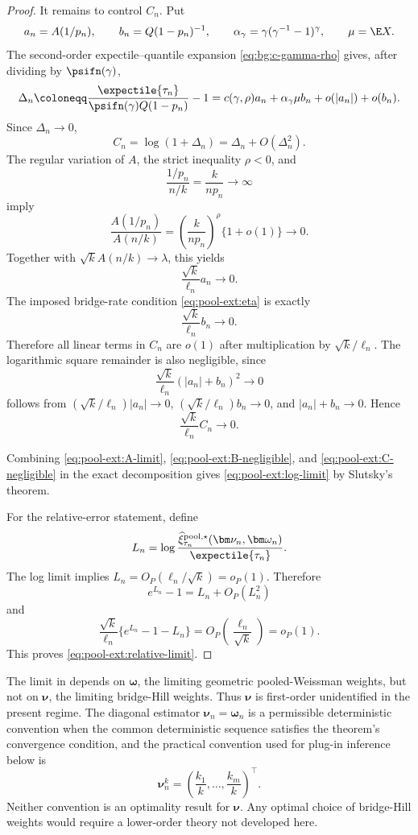 \begin{proof}
It remains to control \(C_n\). Put
\[
  a_n=A(1/p_n),
  \qquad
  b_n=Q(1-p_n)^{-1},
  \qquad
  \alpha_\gamma=\gamma(\gamma^{-1}-1)^\gamma,
  \qquad
  \mu=\E X.
\]
The second-order expectile--quantile expansion
\eqref{eq:bg:c-gamma-rho} gives, after dividing by \(\psifn(\gamma)\),
\[
  \Delta_n
  \coloneqq
  \frac{\expectile{\tau_n}}{\psifn(\gamma)Q(1-p_n)}-1
  =
  c(\gamma,\rho)a_n+\alpha_\gamma\mu b_n
  +o(|a_n|)+o(b_n).
\]
Since \(\Delta_n\to0\),
\[
  C_n=\log(1+\Delta_n)=\Delta_n+O(\Delta_n^2).
\]
The regular variation of \(A\), the strict inequality \(\rho<0\), and
\[
  \frac{1/p_n}{n/k}=\frac{k}{np_n}\to\infty
\]
imply
\[
  \frac{A(1/p_n)}{A(n/k)}
  =
  \left(\frac{k}{np_n}\right)^\rho\{1+o(1)\}
  \to0.
\]
Together with \(\sqrt{k}A(n/k)\to\lambda\), this yields
\[
  \frac{\sqrt{k}}{\ell_n}a_n\to0.
\]
The imposed bridge-rate condition \eqref{eq:pool-ext:eta} is exactly
\[
  \frac{\sqrt{k}}{\ell_n}b_n\to0.
\]
Therefore all linear terms in \(C_n\) are \(o(1)\) after multiplication by
\(\sqrt{k}/\ell_n\). The logarithmic square remainder is also negligible, since
\[
  \frac{\sqrt{k}}{\ell_n}(|a_n|+b_n)^2\to0
\]
follows from
\((\sqrt{k}/\ell_n)|a_n|\to0\), \((\sqrt{k}/\ell_n)b_n\to0\), and
\(|a_n|+b_n\to0\). Hence
\begin{equation}
\label{eq:pool-ext:C-negligible}
  \frac{\sqrt{k}}{\ell_n}C_n\to0.
\end{equation}

Combining \eqref{eq:pool-ext:A-limit}, \eqref{eq:pool-ext:B-negligible}, and
\eqref{eq:pool-ext:C-negligible} in the exact decomposition gives
\eqref{eq:pool-ext:log-limit} by Slutsky's theorem.

For the relative-error statement, define
\[
  L_n=
  \log
  \frac{
    \widehat\xi_{\tau_n}^{\mathrm{pool},\star}(\bm\nu_n,\bm\omega_n)
  }{\expectile{\tau_n}}.
\]
The log limit implies \(L_n=O_P(\ell_n/\sqrt{k})=o_P(1)\). Therefore
\[
  e^{L_n}-1=L_n+O_P(L_n^2)
\]
and
\[
  \frac{\sqrt{k}}{\ell_n}\{e^{L_n}-1-L_n\}
  =
  O_P\!\left(\frac{\ell_n}{\sqrt{k}}\right)
  =
  o_P(1).
\]
This proves \eqref{eq:pool-ext:relative-limit}.
\end{proof}

\begin{remark}
\label{rem:pool-ext:nu-unidentified}
The limit in  depends on
\(\bm\omega\), the limiting geometric pooled-Weissman weights, but not on
\(\bm\nu\), the limiting bridge-Hill weights. Thus \(\bm\nu\) is first-order
unidentified in the present regime. The diagonal estimator
\(\bm\nu_n=\bm\omega_n\) is a permissible deterministic convention when the
common deterministic sequence satisfies the theorem's convergence condition,
and the practical convention used for plug-in inference below is
\[
  \bm\nu_n^k=\left(\frac{k_1}{k},\ldots,\frac{k_m}{k}\right)^\top.
\]
Neither convention is an optimality result for \(\bm\nu\). Any optimal choice
of bridge-Hill weights would require a lower-order theory not developed here.
\end{remark}

